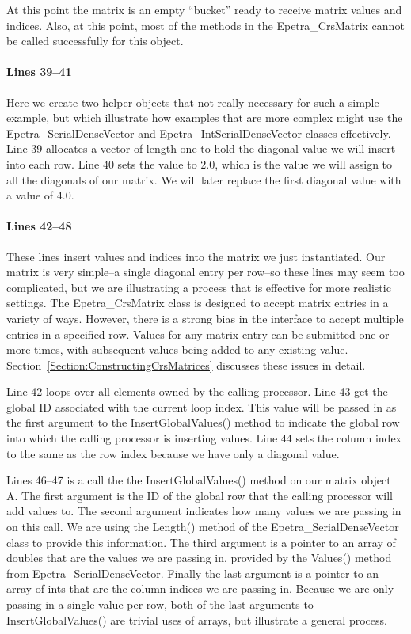 \documentclass[12pt,relax]{EpetraUserGuide}
\newcommand{\serialdensevector}{Epetra\_SerialDenseVector}
\newcommand{\intserialdensevector}{Epetra\_IntSerialDenseVector}
\newcommand{\crsmatrix}{Epetra\_CrsMatrix}
\begin{document}
At this point the matrix is an empty ``bucket'' ready to receive
matrix values and indices.  Also, at this point, most of the methods
in the \crsmatrix{} cannot be called successfully for this object.
\paragraph{Lines 39--41}
Here we create two helper objects that not really necessary for such a
simple example, but which illustrate how examples that are more
complex might
use the \serialdensevector{} and \intserialdensevector{} classes
effectively.
Line 39 allocates a vector of length one to hold the diagonal value
we will insert into each row.  Line 40 sets the value to 2.0, which is
the value we will assign to all the diagonals of our matrix.  We will
later replace the first diagonal value with a value of 4.0.
\paragraph{Lines 42--48}
These lines insert values and indices into the matrix we just
instantiated.  Our matrix is very simple--a single diagonal entry per
row--so these lines may seem too complicated, but we are illustrating
a process that is effective for more realistic settings.
The \crsmatrix{} class is
designed to accept matrix entries in a variety of ways.  However,
there is a strong bias in the interface to accept multiple entries in
a specified row.  Values for any matrix entry can be submitted one or more times,
with subsequent values being added to any existing value.
Section~\ref{Section:ConstructingCrsMatrices} discusses these issues
in detail.

Line 42 loops over all elements
owned by the calling processor.  Line 43 get the global ID associated
with the current loop index.  This value will be passed in as the
first argument to the
InsertGlobalValues() method to indicate the global row into which the calling
processor is inserting values.  Line 44 sets the column index to the
same as the row index because we have only a diagonal value.

Lines 46--47 is a call the the InsertGlobalValues() method on our matrix
object A.  The first argument is the ID of the global row that the
calling processor will add values to.  The second argument indicates
how many values we are passing in on this call.  We are using the
Length() method of the \serialdensevector{} class to provide this
information.  The third argument is a pointer to an array of doubles
that are the values we are passing in,
provided by the Values() method from \serialdensevector{}.  Finally
the last argument is a pointer to an array of ints that are the column
indices we are passing in.  Because we are only passing in a single
value per row, both of the last arguments to InsertGlobalValues() are trivial
uses of arrays, but illustrate a general process.
\end{document}
